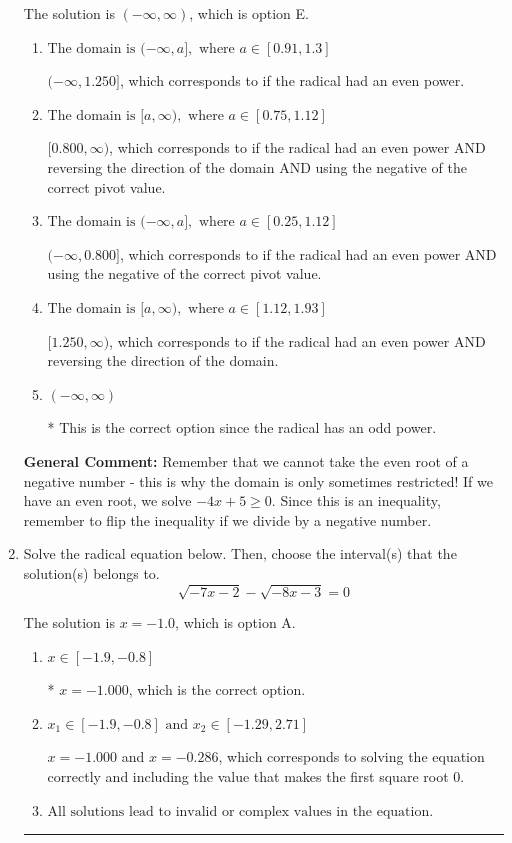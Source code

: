 \documentclass{extbook}[14pt]
\newcommand{\litem}[1]{\item #1

\rule{\textwidth}{0.4pt}}
\begin{document}
\begin{enumerate}
{The solution is \( (-\infty, \infty) \), which is option E.\begin{enumerate}[label=\Alph*.]
\item \( \text{The domain is } (-\infty, a], \text{   where } a \in [0.91, 1.3] \)

$(-\infty, 1.250]$, which corresponds to if the radical had an even power.
\item \( \text{The domain is } [a, \infty), \text{   where } a \in [0.75, 1.12] \)

$[0.800, \infty)$, which corresponds to if the radical had an even power AND reversing the direction of the domain AND using the negative of the correct pivot value.
\item \( \text{The domain is } (-\infty, a], \text{   where } a \in [0.25, 1.12] \)

$(-\infty, 0.800]$, which corresponds to if the radical had an even power AND using the negative of the correct pivot value.
\item \( \text{The domain is } [a, \infty), \text{   where } a \in [1.12, 1.93] \)

$[1.250, \infty)$, which corresponds to if the radical had an even power AND reversing the direction of the domain.
\item \( (-\infty, \infty) \)

* This is the correct option since the radical has an odd power.
\end{enumerate}

\textbf{General Comment:} Remember that we cannot take the even root of a negative number - this is why the domain is only sometimes restricted! If we have an even root, we solve $-4 x + 5 \geq 0$. Since this is an inequality, remember to flip the inequality if we divide by a negative number.
}
\litem{
Solve the radical equation below. Then, choose the interval(s) that the solution(s) belongs to.
\[ \sqrt{-7 x - 2} - \sqrt{-8 x - 3} = 0 \]

The solution is \( x = -1.0 \), which is option A.\begin{enumerate}[label=\Alph*.]
\item \( x \in [-1.9,-0.8] \)

* $x = -1.000$, which is the correct option.
\item \( x_1 \in [-1.9, -0.8] \text{ and } x_2 \in [-1.29,2.71] \)

$x = -1.000$ and $x = -0.286$, which corresponds to solving the equation correctly and including the value that makes the first square root 0.
\item \( \text{All solutions lead to invalid or complex values in the equation.} \)


\end{enumerate}}
\end{enumerate}
\end{document}
